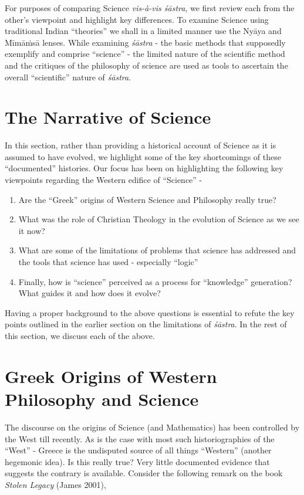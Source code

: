 For purposes of comparing Science \textit{vis-à-vis śāstra}, we first review each from the other’s viewpoint and highlight key differences. To examine Science using traditional Indian “theories” we shall in a limited manner use the Nyāya and Mīmāṁsā lenses. While examining \textit{śāstra} - the basic methods that supposedly exemplify and comprise “science” - the limited nature of the scientific method and the critiques of the philosophy of science are used as tools to ascertain the overall “scientific” nature of \textit{śāstra}.


\section*{The Narrative of Science }

In this section, rather than providing a historical account of Science as it is assumed to have evolved, we highlight some of the key shortcomings of these “documented” histories. Our focus has been on highlighting the following key viewpoints regarding the Western edifice of “Science” -

\begin{enumerate}
\item Are the “Greek” origins of Western Science and Philosophy really true?

 \item What was the role of Christian Theology in the evolution of Science as we see it now?

 \item What are some of the limitations of problems that science has addressed and the tools that science has used - especially “logic”

 \item Finally, how is “science” perceived as a process for “knowledge” generation? What guides it and how does it evolve?

\end{enumerate}

Having a proper background to the above questions is essential to refute the key points outlined in the earlier section on the limitations of \textit{śāstra}. In the rest of this section, we discuss each of the above.


\section*{Greek Origins of Western Philosophy and Science}

The discourse on the origins of Science (and Mathematics) has been controlled by the West till recently. As is the case with most such historiographies of the “West” - Greece is the undisputed source of all things “Western” (another hegemonic idea). Is this really true? Very little documented evidence that suggests the contrary is available. Consider the following remark on the book \textit{Stolen Legacy} (James 2001),

